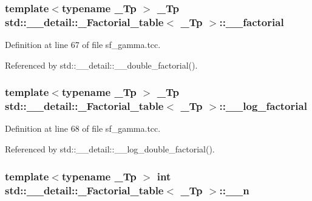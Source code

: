 \subsubsection[{\texorpdfstring{\+\_\+\+\_\+factorial}{__factorial}}]{\setlength{\rightskip}{0pt plus 5cm}template$<$typename \+\_\+\+Tp $>$ \+\_\+\+Tp {\bf std\+::\+\_\+\+\_\+detail\+::\+\_\+\+Factorial\+\_\+table}$<$ \+\_\+\+Tp $>$\+::\+\_\+\+\_\+factorial}\hypertarget{structstd_1_1____detail_1_1__Factorial__table_a4e8d20f3fa301037b097bb9f8e5f2060}{}\label{structstd_1_1____detail_1_1__Factorial__table_a4e8d20f3fa301037b097bb9f8e5f2060}


Definition at line 67 of file sf\+\_\+gamma.\+tcc.



Referenced by std\+::\+\_\+\+\_\+detail\+::\+\_\+\+\_\+double\+\_\+factorial().

\subsubsection[{\texorpdfstring{\+\_\+\+\_\+log\+\_\+factorial}{__log_factorial}}]{\setlength{\rightskip}{0pt plus 5cm}template$<$typename \+\_\+\+Tp $>$ \+\_\+\+Tp {\bf std\+::\+\_\+\+\_\+detail\+::\+\_\+\+Factorial\+\_\+table}$<$ \+\_\+\+Tp $>$\+::\+\_\+\+\_\+log\+\_\+factorial}\hypertarget{structstd_1_1____detail_1_1__Factorial__table_a9d4b412d4d8b46ec660b0441516f412c}{}\label{structstd_1_1____detail_1_1__Factorial__table_a9d4b412d4d8b46ec660b0441516f412c}


Definition at line 68 of file sf\+\_\+gamma.\+tcc.



Referenced by std\+::\+\_\+\+\_\+detail\+::\+\_\+\+\_\+log\+\_\+double\+\_\+factorial().

\subsubsection[{\texorpdfstring{\+\_\+\+\_\+n}{__n}}]{\setlength{\rightskip}{0pt plus 5cm}template$<$typename \+\_\+\+Tp $>$ int {\bf std\+::\+\_\+\+\_\+detail\+::\+\_\+\+Factorial\+\_\+table}$<$ \+\_\+\+Tp $>$\+::\+\_\+\+\_\+n}\hypertarget{structstd_1_1____detail_1_1__Factorial__table_a08dfe7484fca4bcdd1969ce2fa73edc6}{}\label{structstd_1_1____detail_1_1__Factorial__table_a08dfe7484fca4bcdd1969ce2fa73edc6}


